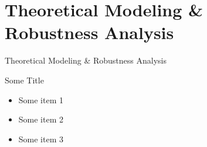 \setlength{\parskip}{\baselineskip}
\section[Theoretical Modeling]{Theoretical Modeling \& Robustness Analysis}

\begin{frame}
	\huge Theoretical Modeling \& Robustness Analysis
\end{frame}

\begin{frame}{Some Title}
	\begin{itemize}
		\item Some item 1
		\item Some item 2
		\item Some item 3
	\end{itemize}
\end{frame}
